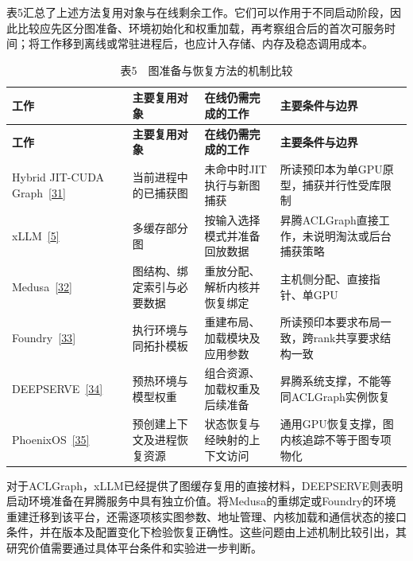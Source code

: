 \documentclass[UTF8,11pt,fontset=windows]{ctexart}
\begin{document}
表5汇总了上述方法复用对象与在线剩余工作。它们可以作用于不同启动阶段，因此比较应先区分图准备、环境初始化和权重加载，再考察组合后的首次可服务时间；将工作移到离线或常驻进程后，也应计入存储、内存及稳态调用成本。

\begingroup\small
\begin{longtable}[]{@{}>{\raggedright\arraybackslash}p{}>{\raggedright\arraybackslash}p{}>{\raggedright\arraybackslash}p{}>{\raggedright\arraybackslash}p{}@{}}
\caption{表5　图准备与恢复方法的机制比较}\tabularnewline
\toprule
\textbf{工作} & \textbf{主要复用对象} & \textbf{在线仍需完成的工作} & \textbf{主要条件与边界} \\
\midrule
\endfirsthead
\toprule
\textbf{工作} & \textbf{主要复用对象} & \textbf{在线仍需完成的工作} & \textbf{主要条件与边界} \\
\midrule
\endhead
Hybrid JIT-CUDA Graph~\protect\hyperlink{ref-31}{{[}31{]}} & 当前进程中的已捕获图 & 未命中时JIT执行与新图捕获 & 所读预印本为单GPU原型，捕获并行性受库限制 \\
xLLM~\protect\hyperlink{ref-5}{{[}5{]}} & 多缓存部分图 & 按输入选择模式并准备回放数据 & 昇腾ACLGraph直接工作，未说明淘汰或后台捕获策略 \\
Medusa~\protect\hyperlink{ref-32}{{[}32{]}} & 图结构、绑定索引与必要数据 & 重放分配、解析内核并恢复绑定 & 主机侧分配、直接指针、单GPU \\
Foundry~\protect\hyperlink{ref-33}{{[}33{]}} & 执行环境与同拓扑模板 & 重建布局、加载模块及应用参数 & 所读预印本要求布局一致，跨rank共享要求结构一致 \\
DEEPSERVE~\protect\hyperlink{ref-34}{{[}34{]}} & 预热环境与模型权重 & 组合资源、加载权重及后续准备 & 昇腾系统支撑，不能等同ACLGraph实例恢复 \\
PhoenixOS~\protect\hyperlink{ref-35}{{[}35{]}} & 预创建上下文及进程恢复资源 & 状态恢复与经映射的上下文访问 & 通用GPU恢复支撑，图内核追踪不等于图专项物化 \\
\bottomrule
\end{longtable}
\endgroup

对于ACLGraph，xLLM已经提供了图缓存复用的直接材料，DEEPSERVE则表明启动环境准备在昇腾服务中具有独立价值。将Medusa的重绑定或Foundry的环境重建迁移到该平台，还需逐项核实图参数、地址管理、内核加载和通信状态的接口条件，并在版本及配置变化下检验恢复正确性。这些问题由上述机制比较引出，其研究价值需要通过具体平台条件和实验进一步判断。
\end{document}
